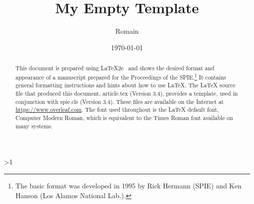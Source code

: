 \documentclass[a4paper]{article}  %
\title{My Empty Template}
\author{Romain \famName{Noël}}
\date{\today}
\newcommand{\Pathbasebib}{\PathR/ref_RN.bib,\PathR/ref_XX.bib}%
\begin{document}

\maketitle

	\begin{abstract}
		This document is prepared using LaTeX2e~\cite{Lamport94} and shows the desired format and appearance of a manuscript prepared for the Proceedings of the SPIE.\footnote{The basic format was developed in 1995 by Rick Hermann (SPIE) and Ken Hanson (Los Alamos National Lab.).}
		It contains general formatting instructions and hints about how to use LaTeX.
		The LaTeX source file that produced this document, {\ttfamily article.tex} (Version 3.4), provides a template, used in conjunction with {\ttfamily spie.cls} (Version 3.4).
		These files are available on the Internet at \url{https://www.overleaf.com}.
		The font used throughout is the LaTeX default font, Computer Modern Roman, which is equivalent to the Times Roman font available on many systems.
	\end{abstract}





\ifnum\value{levelstanda}>1
	{}%
\else

	\printunsrtglossary[type=acronym]
	\printunsrtglossary[type=symbol]
\fi

\addtocounter{levelstanda}{-1}
\end{document}
